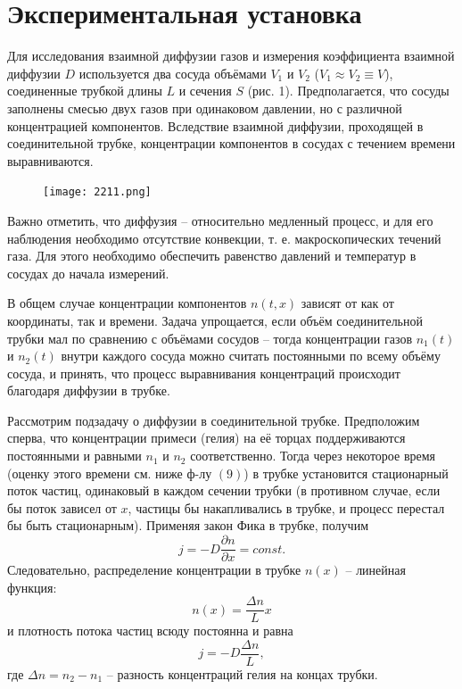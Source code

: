 \section{Экспериментальная установка}

Для исследования взаимной диффузии газов и измерения коэффициента взаимной диффузии $D$ используется два сосуда объёмами $V_1$ и $V_2$ ($V_1 \approx V_2 \equiv V$), соединенные трубкой длины $L$ и сечения $S$ (рис. 1). Предполагается, что сосуды заполнены смесью двух газов при одинаковом давлении, но с различной концентрацией компонентов. Вследствие взаимной диффузии, проходящей в соединительной трубке, концентрации компонентов в сосудах с течением времени выравниваются.

\begin{figure} 
    \texttt{[image: 2211.png]}
\end{figure}

Важно отметить, что диффузия -- относительно медленный процесс, и для его наблюдения необходимо отсутствие конвекции, т. е. макроскопических течений газа. Для этого необходимо обеспечить равенство давлений и температур в сосудах до начала измерений.

В общем случае концентрации компонентов $n(t, x)$ зависят от как от координаты, так и времени. Задача упрощается, если объём соединительной трубки мал по сравнению с объёмами сосудов -- тогда концентрации газов $n_1(t)$ и $n_2(t)$ внутри каждого сосуда можно считать постоянными по всему объёму сосуда, и принять, что процесс выравнивания концентраций происходит благодаря диффузии в трубке.

Рассмотрим подзадачу о диффузии в соединительной трубке. Предположим сперва, что концентрации примеси (гелия) на её торцах поддерживаются постоянными и равными $n_1$ и $n_2$ соответственно. Тогда через некоторое время (оценку этого времени см. ниже ф-лу $(9)$) в трубке установится стационарный поток частиц, одинаковый в каждом сечении трубки (в противном случае, если бы поток зависел от $x$, частицы бы накапливались в трубке, и процесс перестал бы быть стационарным). Применяя закон Фика в трубке, получим $$j = -D \dfrac{\partial n}{\partial x} = const.$$
Следовательно, распределение концентрации в трубке $n(x)$ -- линейная функция:
\begin{equation}
	n(x) = \dfrac{\Delta n}{L} x
\end{equation}
и плотность потока частиц всюду постоянна и равна
\begin{equation}
	j = -D \dfrac{\Delta n}{L},
\end{equation}
где $\Delta n = n_2 - n_1$ -- разность концентраций гелия на концах трубки.

